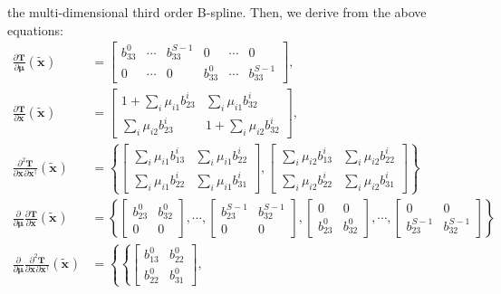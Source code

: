 \documentclass{InsightArticle}
\newcommand{\vT}{\bm{T}}
\newcommand{\vmu}{\bm{\mu}}
\newcommand{\vx}[1][]{\bm{x}_{#1}}
\newcommand{\vxt}[1][]{\bm{\widetilde x}_{#1}}
\newcommand{\D}[2]{\frac{\partial #1}{\partial #2}}
\newcommand{\Dd}[3]{\frac{\partial^2 #1}{\partial #2 \partial #3}}
\newcommand{\trp}{^{\dagger}}
\begin{document}
the multi-dimensional third order B-spline. Then, we derive from the
above equations:
\begin{align}
\D{\vT}{\vmu}(\vxt) &= \begin{bmatrix} b_{33}^{0} & \cdots &
b_{33}^{S-1} & 0 & \cdots & 0 \\ 0 & \cdots & 0 & b_{33}^{0} &
\cdots & b_{33}^{S-1} \end{bmatrix},\label{eq:bspline-jac} \\
\D{\vT}{\vx}(\vxt) &= \begin{bmatrix} 1 + \sum_i \mu_{i1} b_{23}^i &
\sum_i \mu_{i1} b_{32}^i \\ \sum_i \mu_{i2} b_{23}^{i} & 1 + \sum_i
\mu_{i2} b_{32}^{i} \end{bmatrix},\label{eq:bspline-sjac} \\
\Dd{\vT}{\vx}{\vx\trp}(\vxt) &= \left\{ \begin{bmatrix} \sum_i
\mu_{i1} b_{13}^i & \sum_i \mu_{i1} b_{22}^i \\ \sum_i \mu_{i1}
b_{22}^{i} & \sum_i \mu_{i1} b_{31}^{i} \end{bmatrix},
\begin{bmatrix} \sum_i \mu_{i2} b_{13}^{i} & \sum_i \mu_{i2}
b_{22}^{i} \\ \sum_i \mu_{i2} b_{22}^{i} & \sum_i \mu_{i2}
b_{31}^{i} \end{bmatrix} \right\}\label{eq:bspline-shes} \\
\D{}{\vmu} \D{\vT}{\vx}(\vxt) &= \left\{ \begin{bmatrix} b_{23}^{0}
& b_{32}^{0} \\ 0 & 0 \end{bmatrix}, \cdots, \begin{bmatrix}
b_{23}^{S-1} & b_{32}^{S-1} \\ 0 & 0 \end{bmatrix},
\begin{bmatrix} 0 & 0 \\ b_{23}^{0} & b_{32}^{0} \end{bmatrix},
\cdots,
\begin{bmatrix} 0 & 0 \\ b_{23}^{S-1} & b_{32}^{S-1} \end{bmatrix}
\right\} \label{eq:bspline-jacsjac} \\
\D{}{\vmu} \Dd{\vT}{\vx}{\vx\trp}(\vxt) &= \left\{ \left\{
\begin{bmatrix} b_{13}^0 & b_{22}^0 \\ b_{22}^0 & b_{31}^0 \end{bmatrix},

\end{align}
\end{document}

